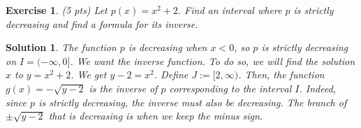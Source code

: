 \documentclass[12pt]{article}
\theoremstyle{plain}
\newtheorem{exer}{\textbf{Exercise}}}
\theoremstyle{plain}
\newtheorem*{sol}{\textbf{Solution}}}
\theoremstyle{plain}
\theoremstyle{plain}
\begin{document}
\begin{exer}
(5 pts)
Let $p(x) = x^2 + 2$. Find an interval where $p$ is strictly decreasing and find a formula for its inverse.
\end{exer}
\begin{sol}
The function $p$ is decreasing when $x < 0$, so $p$ is strictly decreasing on $I = (-\infty , 0]$. We want the inverse function. To do so, we will find the solution $x$ to $y= x^2 + 2$. We get $y - 2 = x^2$. Define $J := [2, \infty )$. Then, the function $g(x) = -\sqrt{y- 2}$ is the inverse of $p$ corresponding to the interval $I$. Indeed, since $p$ is strictly decreasing, the inverse must also be decreasing. The branch of $\pm \sqrt{y - 2}$ that is decreasing is when we keep the minus sign.
\end{sol}
\end{document}
